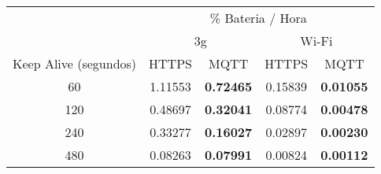 \begin{tabular}{|c|c|c|c|c|}
  \hhline{~|----|}
  \multicolumn{1}{l|}{} & \multicolumn{4}{c|}{\cellcolor[HTML]{ECF4FF}\% Bateria / Hora} \\
  \hhline{~--|--|}
  \rowcolor[HTML]{FFEAD0}
  \multicolumn{1}{c|}{\cellcolor[HTML]{FFFFFF}} & \multicolumn{2}{c|}{3g} & \multicolumn{2}{c|}{Wi-Fi} \\
  \hline
  \rowcolor[HTML]{E3FFE3}
  Keep Alive (segundos) & HTTPS & MQTT & HTTPS & MQTT \\
  \hline
  60 & 1.11553 & \textbf{0.72465} & 0.15839 & \textbf{0.01055} \\
  \hline
  120 & 0.48697 & \textbf{0.32041} & 0.08774 & \textbf{0.00478} \\
  \hline
  240 & 0.33277 & \textbf{0.16027} & 0.02897 & \textbf{0.00230} \\
  \hline
  480 & 0.08263 & \textbf{0.07991} & 0.00824 & \textbf{0.00112} \\
  \hline
\end{tabular}